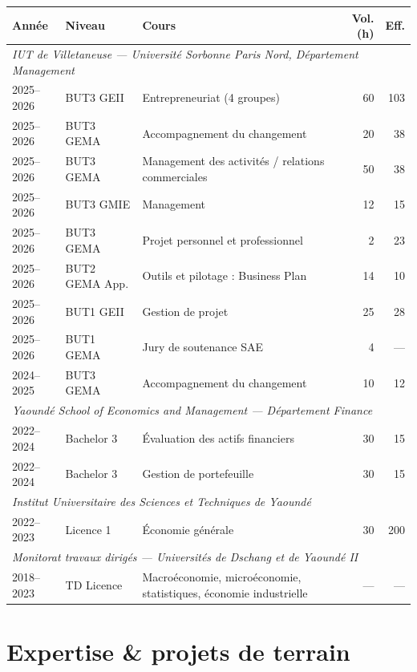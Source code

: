 \documentclass[
  french,
  10pt,
  letterpaper,
  DIV=11,
  numbers=noendperiod]{scrartcl}
\begin{document}
\begin{center}
\footnotesize
\renewcommand{\arraystretch}{1.25}
\begin{tabularx}{\textwidth}{@{}l l X r r@{}}
\toprule
\textbf{Année} & \textbf{Niveau} & \textbf{Cours} & \textbf{Vol. (h)} & \textbf{Eff.} \\
\midrule
\multicolumn{5}{l}{\textit{IUT de Villetaneuse — Université Sorbonne Paris Nord, Département Management}} \\
\midrule
2025–2026 & BUT3 GEII & Entrepreneuriat (4 groupes) & 60 & 103 \\
2025–2026 & BUT3 GEMA & Accompagnement du changement & 20 & 38 \\
2025–2026 & BUT3 GEMA & Management des activités / relations commerciales & 50 & 38 \\
2025–2026 & BUT3 GMIE & Management & 12 & 15 \\
2025–2026 & BUT3 GEMA & Projet personnel et professionnel & 2 & 23 \\
2025–2026 & BUT2 GEMA App. & Outils et pilotage : Business Plan & 14 & 10 \\
2025–2026 & BUT1 GEII & Gestion de projet & 25 & 28 \\
2025–2026 & BUT1 GEMA & Jury de soutenance SAE & 4 & — \\
2024–2025 & BUT3 GEMA & Accompagnement du changement & 10 & 12 \\
\midrule
\multicolumn{5}{l}{\textit{Yaoundé School of Economics and Management — Département Finance}} \\
\midrule
2022–2024 & Bachelor 3 & Évaluation des actifs financiers & 30 & 15 \\
2022–2024 & Bachelor 3 & Gestion de portefeuille & 30 & 15 \\
\midrule
\multicolumn{5}{l}{\textit{Institut Universitaire des Sciences et Techniques de Yaoundé}} \\
\midrule
2022–2023 & Licence 1 & Économie générale & 30 & 200 \\
\midrule
\multicolumn{5}{l}{\textit{Monitorat travaux dirigés — Universités de Dschang et de Yaoundé II}} \\
\midrule
2018–2023 & TD Licence & Macroéconomie, microéconomie, statistiques, économie industrielle & — & — \\
\bottomrule
\end{tabularx}
\end{center}

\section{Expertise \& projets de
terrain}\label{expertise-projets-de-terrain}
\end{document}

